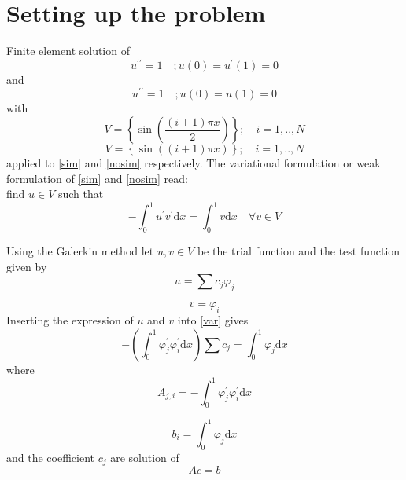 \documentclass[10pt,a4paper]{report}
\begin{document}
\section{Setting up the problem}
Finite element solution of 
\begin{equation}\label{sim}
u^{\prime\prime} = 1\quad; u(0) = u^{\prime}(1)= 0
\end{equation}
and 
\begin{equation}\label{nosim}
u^{\prime\prime} = 1\quad; u(0) = u(1)= 0
\end{equation}
with 
\begin{equation}
V = \left\lbrace\sin\left( \frac{(i+1)\pi x}{2}\right)\right\rbrace; \quad i = 1,..,N
\end{equation}
\begin{equation}
V = \left\lbrace\sin( (i+1)\pi x)\right\rbrace; \quad i = 1,..,N
\end{equation}
applied to \ref{sim} and \ref{nosim} respectively.
The variational formulation or weak formulation of \ref{sim} and \ref{nosim} read:\\
find $u\in  V$ such that
\begin{equation}\label{var}
-\int_{0}^{1} u^{\prime} v^{\prime} \mathrm{d}x = \int_{0}^{1} v \mathrm{d}x
\quad \forall v\in V
\end{equation}

Using the Galerkin method let $u,v \in V$ be the trial function and the test function given by
\begin{equation}
u = \sum{c_{j}\varphi_{j}}
\end{equation}

\begin{equation}
v = \varphi_{i}
\end{equation}
Inserting the expression of $u$ and $v$ into \ref{var} gives
\begin{equation}
-\left(\int_{0}^{1} \varphi_{j}^{\prime} \varphi_{i}^{\prime} \mathrm{d}x\right)\sum{c_{j}} =\int_{0}^{1} \varphi_{j} \mathrm{d}x
\end{equation}
where 
\begin{equation}
A_{j,i} = -\int_{0}^{1} \varphi_{j}^{\prime} \varphi_{i}^{\prime} \mathrm{d}x
\end{equation}

\begin{equation}
b_{i} = \int_{0}^{1} \varphi_{j} \mathrm{d}x
\end{equation}
and the coefficient $c_{j}$ are solution of 
\begin{equation}
Ac = b
\end{equation}
\end{document}
